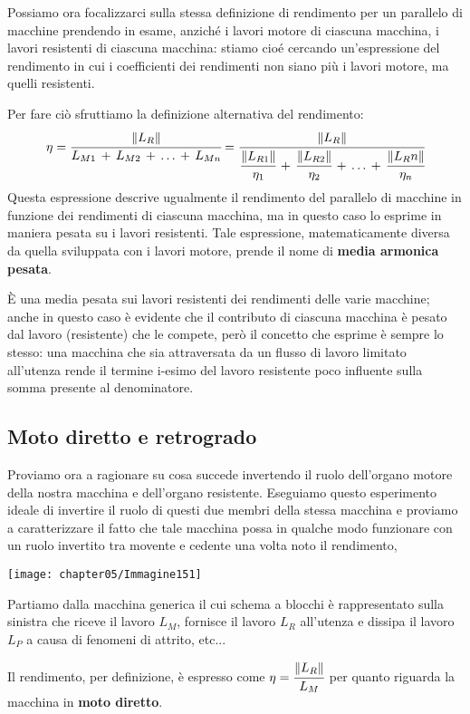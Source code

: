 Possiamo ora focalizzarci sulla stessa definizione di rendimento per un parallelo di macchine prendendo in esame, anziché i lavori motore di ciascuna macchina, i lavori resistenti di ciascuna macchina: stiamo cioé cercando un'espressione del rendimento in cui i coefficienti dei rendimenti non siano più i lavori motore, ma quelli resistenti.

Per fare ciò sfruttiamo la definizione alternativa del rendimento:
\[\eta = \cfrac{\lVert L_R\rVert}{L_{M1}\,+\,L_{M2}\,+\,\dots\,+\,L_{Mn}} = \cfrac{\lVert L_R\rVert}{\cfrac{\lVert L_{R1}\rVert}{\eta_1}\,+\,\cfrac{\lVert L_{R2}\rVert}{\eta_2}\,+\,\dots\,+\,\cfrac{\lVert L_Rn\rVert}{\eta_n}}\]
Questa espressione descrive ugualmente il rendimento del parallelo di macchine in funzione dei rendimenti di ciascuna macchina, ma in questo caso lo esprime in maniera pesata su i lavori resistenti. Tale espressione, matematicamente diversa da quella sviluppata con i lavori motore, prende il nome di \textbf{media armonica pesata}. 

È una media pesata sui lavori resistenti dei rendimenti delle varie macchine; anche in questo caso è evidente che il contributo di ciascuna macchina è pesato dal lavoro (resistente) che le compete, però il concetto che esprime è sempre lo stesso: una macchina che sia attraversata da un flusso di lavoro limitato all'utenza rende il termine i-esimo del lavoro resistente poco influente sulla somma presente al denominatore.

\subsection{Moto diretto e retrogrado}
Proviamo ora a ragionare su cosa succede invertendo il ruolo dell'organo motore della nostra macchina e dell'organo resistente. Eseguiamo questo esperimento ideale di invertire il ruolo di questi due membri della stessa macchina e proviamo a caratterizzare il fatto che tale macchina possa in qualche modo funzionare con un ruolo invertito tra movente e cedente una volta noto il rendimento,

\begin{center}
\texttt{[image: chapter05/Immagine151]}
\end{center}

Partiamo dalla macchina generica il cui schema a blocchi è rappresentato sulla sinistra che riceve il lavoro $L_M$, fornisce il lavoro $L_R$ all'utenza e dissipa il lavoro $L_P$ a causa di fenomeni di attrito, etc...

Il rendimento, per definizione, è espresso come $\eta = \cfrac{\lVert L_R\rVert}{L_M}$ per quanto riguarda la macchina in \textbf{moto diretto}.

